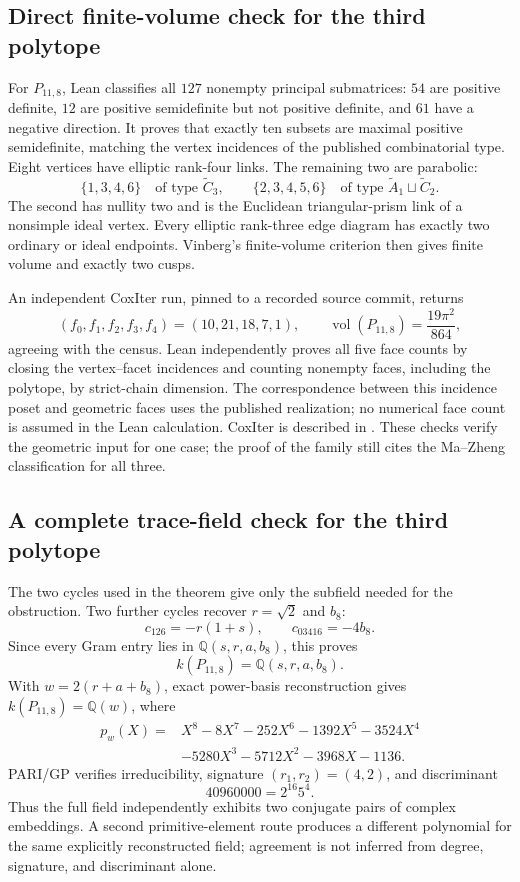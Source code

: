 \documentclass[11pt]{article}
\numberwithin{equation}{section}
\theoremstyle{definition}
\theoremstyle{remark}
\newcommand{\Q}{\mathbb{Q}}
\newcommand{\vol}{\operatorname{vol}}
\begin{document}
\subsection{Direct finite-volume check for the third polytope}

For \(P_{11,8}\), Lean classifies all \(127\) nonempty principal submatrices:
\(54\) are positive definite, \(12\) are positive semidefinite but not
positive definite, and \(61\) have a negative direction.  It proves that
exactly ten subsets are maximal positive semidefinite, matching the vertex
incidences of the published combinatorial type.  Eight vertices have elliptic rank-four links.
The remaining two are parabolic:
\[
 \{1,3,4,6\}\quad\text{of type }\widetilde C_3,
 \qquad
 \{2,3,4,5,6\}\quad\text{of type }
 \widetilde A_1\sqcup\widetilde C_2.
\]
The second has nullity two and is the Euclidean triangular-prism link of a
nonsimple ideal vertex.  Every elliptic rank-three edge diagram has exactly
two ordinary or ideal endpoints.  Vinberg's finite-volume criterion
\cite{VinbergReflections} then gives finite volume and exactly two cusps.

An independent CoxIter run, pinned to a recorded source commit, returns
\[
 (f_0,f_1,f_2,f_3,f_4)=(10,21,18,7,1),
 \qquad \vol(P_{11,8})=\frac{19\pi^2}{864},
\]
agreeing with the census.  Lean independently proves all five face counts
by closing the vertex--facet incidences and counting nonempty faces,
including the polytope, by strict-chain dimension.  The correspondence
between this incidence poset and geometric faces uses the published
realization; no numerical face count is assumed in the Lean calculation.
CoxIter is described in \cite{Guglielmetti}.
These checks verify the geometric input for one case; the proof of
the family still cites the
Ma--Zheng classification for all three.

\subsection{A complete trace-field check for the third polytope}

The two cycles used in the theorem give only the subfield needed for the
obstruction.  Two further cycles recover \(r=\sqrt2\) and \(b_8\):
\[
 c_{126}=-r(1+s),\qquad c_{03416}=-4b_8.
\]
Since every Gram entry lies in \(\Q(s,r,a,b_8)\), this proves
\[
 k(P_{11,8})=\Q(s,r,a,b_8).
\]
With \(w=2(r+a+b_8)\), exact power-basis reconstruction gives
\(k(P_{11,8})=\Q(w)\), where
\begin{equation}
\begin{aligned}
 p_w(X)={}&X^8-8X^7-252X^6-1392X^5-3524X^4\\
          &-5280X^3-5712X^2-3968X-1136.
\end{aligned}
\label{eq:primitive-polynomial}
\end{equation}
PARI/GP verifies irreducibility, signature
\((r_1,r_2)=(4,2)\), and discriminant
\[
 40960000=2^{16}5^4.
\]
Thus the full field independently exhibits two conjugate pairs of complex
embeddings.  A second primitive-element route produces a different polynomial
for the same explicitly reconstructed field; agreement is not inferred from
degree, signature, and discriminant alone.
\end{document}
